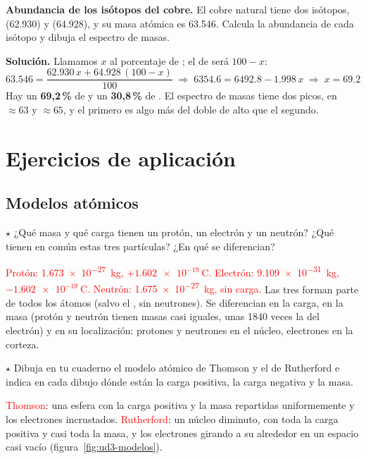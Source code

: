 \begin{example}
    \textbf{Abundancia de los isótopos del cobre.} El cobre natural tiene dos isótopos,  (\qty{62.930}{\uma}) y
     (\qty{64.928}{\uma}), y su masa atómica es \qty{63.546}{\uma}. Calcula la abundancia de cada isótopo y dibuja el
    espectro de masas.

    \textbf{Solución.} Llamamos \(x\) al porcentaje de ; el de  será \(100 - x\):
    \[ \num{63.546} = \frac{\num{62.930}\,x + \num{64.928}\,(100 - x)}{100} \;\Rightarrow\; \num{6354.6} = \num{6492.8} - \num{1.998}\,x
    \;\Rightarrow\; x = \num{69.2} \]
    Hay un \textbf{69,2\,\%} de  y un \textbf{30,8\,\%} de . El espectro de masas tiene dos picos, en
    \(\approx 63\) y \(\approx 65\), y el primero es algo más del doble de alto que el segundo.
\end{example}

\section{Ejercicios de aplicación}\label{sec:ud3-aplicacion}

\subsection{Modelos atómicos}

\begin{exercise}
    \(\star\) ¿Qué masa y qué carga tienen un protón, un electrón y un neutrón? ¿Qué tienen en común estas tres partículas? ¿En
    qué se diferencian?
    \begin{solu}
        \textcolor{red}{Protón: \qty{1.673e-27}{\kilo\gram}, \(+\qty{1.602e-19}{\coulomb}\). Electrón: \qty{9.109e-31}{\kilo\gram},
        \(-\qty{1.602e-19}{\coulomb}\). Neutrón: \qty{1.675e-27}{\kilo\gram}, sin carga.} Las tres forman parte de todos los
        átomos (salvo el , sin neutrones). Se diferencian en la carga, en la masa (protón y neutrón tienen masas casi
        iguales, unas 1840 veces la del electrón) y en su localización: protones y neutrones en el núcleo, electrones en la corteza.
    \end{solu}
\end{exercise}

\begin{exercise}
    \(\star\) Dibuja en tu cuaderno el modelo atómico de Thomson y el de Rutherford e indica en cada dibujo dónde están la carga
    positiva, la carga negativa y la masa.
    \begin{solu}
        \textcolor{red}{Thomson}: una esfera con la carga positiva y la masa repartidas uniformemente y los electrones incrustados.
        \textcolor{red}{Rutherford}: un núcleo diminuto, con toda la carga positiva y casi toda la masa, y los electrones girando a
        su alrededor en un espacio casi vacío (figura~\ref{fig:ud3-modelos}).
    \end{solu}
\end{exercise}

